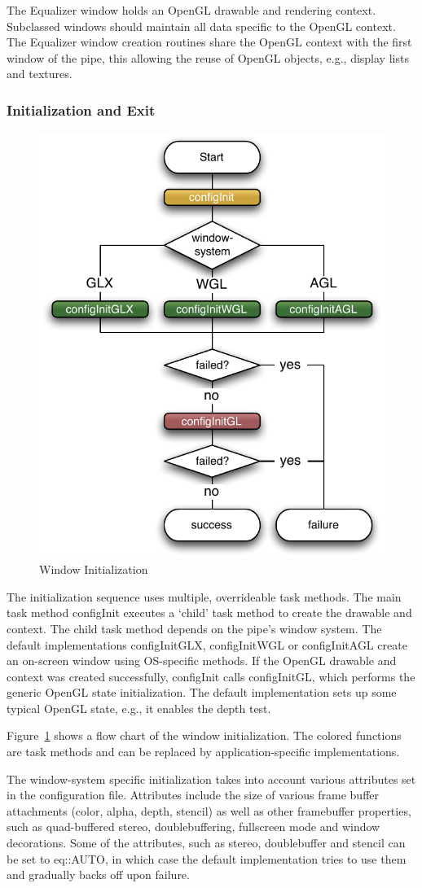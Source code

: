 \documentclass[10pt,a4]{scrartcl}
\newcommand{\fig}[1]{Figure~\ref{#1}}
\begin{document}
The Equalizer window holds an OpenGL drawable and rendering
context. Subclassed windows should maintain all data specific to the
OpenGL context. The Equalizer window creation routines share the OpenGL
context with the first window of the pipe, this allowing the reuse of
OpenGL objects, e.g., display lists and textures.

\subsubsection{Initialization and Exit}

\begin{figure}
  \includegraphics[width=.4\textwidth]{images/windowInit.pdf}
  {\caption{\small\label{fWindowInit}Window Initialization}}
\end{figure}

The initialization sequence uses multiple, overrideable task
methods. The main task method \textsf{configInit} executes a `child'
task method to create the drawable and context. The child task method
depends on the pipe's window system. The default implementations
\textsf{configInitGLX}, \textsf{configInitWGL} or \textsf{configInitAGL}
create an on-screen window using OS-specific methods. If the OpenGL
drawable and context was created successfully, \textsf{configInit} calls
\textsf{configInitGL}, which performs the generic OpenGL state
initialization. The default implementation sets up some typical OpenGL
state, e.g., it enables the depth test.

\fig{fWindowInit} shows a flow chart of the window initialization. The
colored functions are task methods and can be replaced by
application-specific implementations.

The window-system specific initialization takes into account various
attributes set in the configuration file. Attributes include the size of
various frame buffer attachments (color, alpha, depth, stencil) as well
as other framebuffer properties, such as quad-buffered stereo,
doublebuffering, fullscreen mode and window decorations. Some of the
attributes, such as stereo, doublebuffer and stencil can be set to
\textsf{eq::AUTO}, in which case the default implementation tries to use
them and gradually backs off upon failure.
\end{document}
